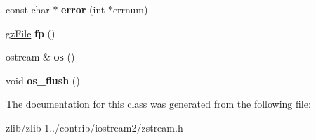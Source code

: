 \begin{DoxyCompactItemize}
\item 
\hypertarget{classozstream_a189c85676e712ba4776bb17e1de22388}{const char $\ast$ {\bfseries error} (int $\ast$errnum)}\label{classozstream_a189c85676e712ba4776bb17e1de22388}

\item 
\hypertarget{classozstream_ab1743675ebfa7173c06f803f41844b18}{\hyperlink{structgz_file__s}{gz\+File} {\bfseries fp} ()}\label{classozstream_ab1743675ebfa7173c06f803f41844b18}

\item 
\hypertarget{classozstream_acbbb07b71280b24534fc6e0ca8366ae2}{ostream \& {\bfseries os} ()}\label{classozstream_acbbb07b71280b24534fc6e0ca8366ae2}

\item 
\hypertarget{classozstream_aa65b61b59ad9d43f3f35095cb353f57f}{void {\bfseries os\+\_\+flush} ()}\label{classozstream_aa65b61b59ad9d43f3f35095cb353f57f}

\end{DoxyCompactItemize}


The documentation for this class was generated from the following file\+:\begin{DoxyCompactItemize}
\item 
zlib/zlib-\/1../contrib/iostream2/zstream.\+h\end{DoxyCompactItemize}

